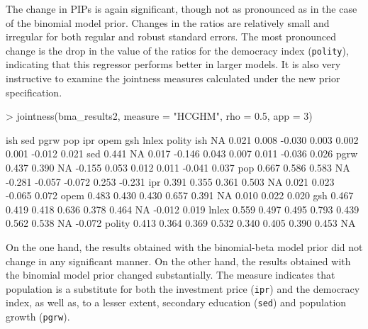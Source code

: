 \documentclass[a4paper]{article}
\begin{document}
The change in PIPs is again significant, though not as pronounced as in the case of the binomial model prior.
Changes in the ratios are relatively small and irregular for both regular and robust standard errors.
The most pronounced change is the drop in the value of the ratios for the democracy index (\verb+polity+), indicating that this regressor performs better in larger models.
It is also very instructive to examine the jointness measures calculated under the new prior specification.
\begin{Schunk}
\begin{Sinput}
> jointness(bma_results2, measure = "HCGHM", rho = 0.5, app = 3)
\end{Sinput}
\begin{Soutput}
         ish   sed  pgrw    pop    ipr   opem    gsh  lnlex polity
ish       NA 0.021 0.008 -0.030  0.003  0.002  0.001 -0.012  0.021
sed    0.441    NA 0.017 -0.146  0.043  0.007  0.011 -0.036  0.026
pgrw   0.437 0.390    NA -0.155  0.053  0.012  0.011 -0.041  0.037
pop    0.667 0.586 0.583     NA -0.281 -0.057 -0.072  0.253 -0.231
ipr    0.391 0.355 0.361  0.503     NA  0.021  0.023 -0.065  0.072
opem   0.483 0.430 0.430  0.657  0.391     NA  0.010  0.022  0.020
gsh    0.467 0.419 0.418  0.636  0.378  0.464     NA -0.012  0.019
lnlex  0.559 0.497 0.495  0.793  0.439  0.562  0.538     NA -0.072
polity 0.413 0.364 0.369  0.532  0.340  0.405  0.390  0.453     NA
\end{Soutput}
\end{Schunk}
On the one hand, the results obtained with the binomial-beta model prior did not change in any significant manner.
On the other hand, the results obtained with the binomial model prior changed substantially.
The measure indicates that population is a substitute for both the investment price (\verb+ipr+) and the democracy index, as well as, to a lesser extent, secondary education (\verb+sed+) and population growth (\verb+pgrw+).
\end{document}
